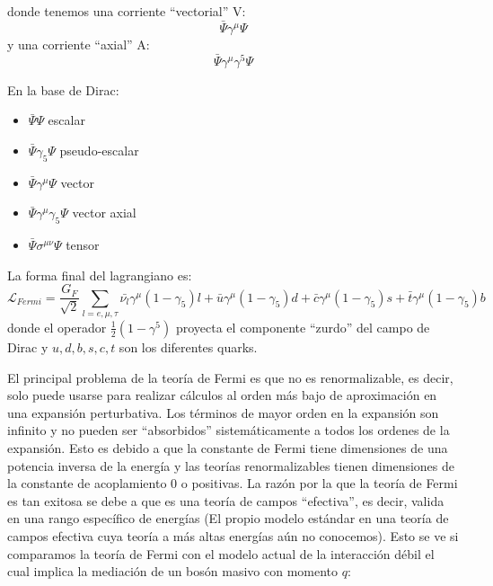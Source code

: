 \documentclass{article}
\theoremstyle{plain}
\theoremstyle{definition}
\begin{document}
	 donde tenemos una corriente ``vectorial'' V:
	 \[
	 \bar{\Psi}\gamma^\mu\Psi
	 \]
	 y una corriente ``axial'' A:
	 \[
	 \bar{\Psi}\gamma^\mu\gamma^5\Psi
	 \] 
	 	\begin{longfbox}
	 	En la base de Dirac:	
	 	\begin{center}
	 		\begin{minipage}{.5\textwidth}
	 \begin{itemize}
	 	\item \(\bar{\Psi}\Psi\) escalar	
	 	\item \(\bar{\Psi}\gamma_5\Psi\) pseudo-escalar
	 	\item \(\bar{\Psi}\gamma^\mu\Psi\) vector
	 	\item \(\bar{\Psi}\gamma^\mu\gamma_5\Psi\) vector axial
	 	\item \(\bar{\Psi}\sigma^{\mu\nu}\Psi\) tensor
	 \end{itemize}
 \end{minipage}
\end{center}
	 \end{longfbox}
	 La forma final del lagrangiano es: 
	\begin{dmath}\label{FermiLagrangian}
		\mathcal{L}_{Fermi}  = \frac{G_F}{\sqrt{2}} \sum_{l=e,\mu,\tau}\bar{\nu_l}\gamma^\mu  \left(1-\gamma_5\right)l +\bar{u}\gamma^\mu\left(1-\gamma_5\right)d + \bar{c}\gamma^\mu\left(1-\gamma_5\right)s + \bar{t}\gamma^\mu\left(1-\gamma_5\right)b
	\end{dmath}
	donde el operador \(\frac{1}{2}(1-\gamma^5)\) proyecta el componente ``zurdo'' del campo de Dirac y \(u,d,b,s,c,t\) son los diferentes quarks.
\par
	El principal problema de la teoría de Fermi es que no es renormalizable, es decir, solo puede usarse para realizar cálculos al orden más bajo de aproximación en una expansión perturbativa. Los términos de mayor orden en la expansión son infinito y no pueden ser ``absorbidos'' sistemáticamente a todos los ordenes de la expansión. Esto es debido a que la constante de Fermi tiene dimensiones de una potencia inversa de la energía y las teorías renormalizables tienen dimensiones de la constante de acoplamiento 0 o positivas. La razón por la que la teoría de Fermi es tan exitosa  se debe a que es una teoría de campos ``efectiva'', es decir, valida en una rango específico de energías (El propio modelo estándar en una teoría de campos efectiva cuya teoría a más altas energías aún no conocemos). Esto se ve si comparamos la teoría de Fermi con el modelo actual de la interacción débil el cual implica la mediación de un bosón masivo con momento \(q\):
\end{document}
